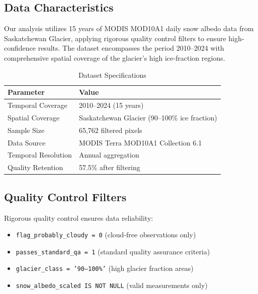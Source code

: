 \documentclass[12pt,a4paper]{article}
\begin{document}
\subsection{Data Characteristics}

Our analysis utilizes 15 years of MODIS MOD10A1 daily snow albedo data from Saskatchewan Glacier, applying rigorous quality control filters to ensure high-confidence results. The dataset encompasses the period 2010--2024 with comprehensive spatial coverage of the glacier's high ice-fraction regions.

\begin{table}[H]
\centering
\caption{Dataset Specifications}
\label{tab:dataset_specs}
\begin{tabular}{@{}ll@{}}
\toprule
\textbf{Parameter} & \textbf{Value} \\
\midrule
Temporal Coverage & 2010--2024 (15 years) \\
Spatial Coverage & Saskatchewan Glacier (90--100\% ice fraction) \\
Sample Size & 65,762 filtered pixels \\
Data Source & MODIS Terra MOD10A1 Collection 6.1 \\
Temporal Resolution & Annual aggregation \\
Quality Retention & 57.5\% after filtering \\
\bottomrule
\end{tabular}
\end{table}

\subsection{Quality Control Filters}

Rigorous quality control ensures data reliability:
\begin{itemize}
    \item \texttt{flag\_probably\_cloudy = 0} (cloud-free observations only)
    \item \texttt{passes\_standard\_qa = 1} (standard quality assurance criteria)
    \item \texttt{glacier\_class = '90--100\%'} (high glacier fraction areas)
    \item \texttt{snow\_albedo\_scaled IS NOT NULL} (valid measurements only)
\end{itemize}
\end{document}
